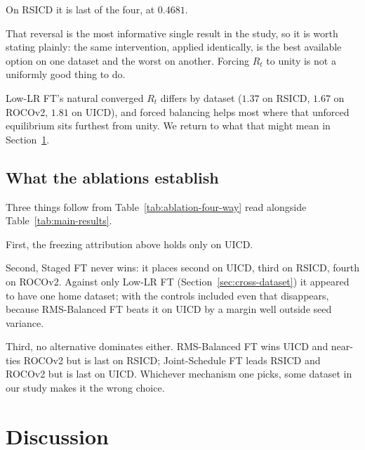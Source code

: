 \documentclass[journal]{IEEEtran}
\begin{document}
On RSICD it is last of the four, at $0.4681$.

That reversal is the most informative single result in the
study, so it is worth stating plainly: the same intervention,
applied identically, is the best available option on one dataset
and the worst on another. Forcing $R_t$ to unity is not a
uniformly good thing to do.

Low-LR FT's natural converged $R_t$ differs by dataset ($1.37$ on
RSICD, $1.67$ on ROCOv2, $1.81$ on UICD), and forced balancing helps
most where that unforced equilibrium sits furthest from unity. We
return to what that might mean in Section~\ref{sec:discussion}.

\subsection{What the ablations establish}
Three things follow from Table~\ref{tab:ablation-four-way} read alongside Table~\ref{tab:main-results}.

First, the freezing attribution above holds only on UICD.

Second, Staged FT never wins: it places second on UICD, third on
RSICD, fourth on ROCOv2. Against only Low-LR FT
(Section~\ref{sec:cross-dataset}) it appeared to have one home
dataset; with the controls included even that disappears, because
RMS-Balanced FT beats it on UICD by a margin well outside seed
variance.

Third, no alternative dominates either. RMS-Balanced FT wins UICD and
near-ties ROCOv2 but is last on RSICD; Joint-Schedule FT leads RSICD
and ROCOv2 but is last on UICD. Whichever mechanism one picks, some
dataset in our study makes it the wrong choice.


\section{Discussion}
\label{sec:discussion}
\end{document}
